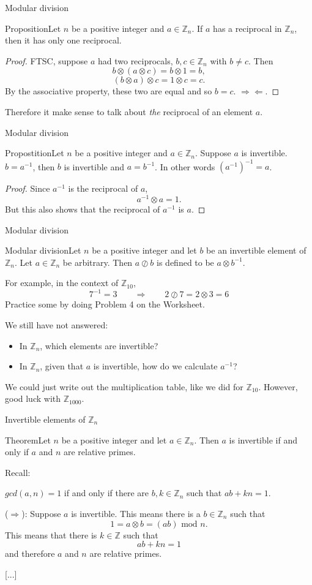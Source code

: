 \documentclass{beamer}
\def\bl[#1]#2{\begin{block}{#1}#2\end{block}}
\def\itemb{\begin{itemize}}
\def\iteme{\end{itemize}}
\begin{document}
\begin{frame}{Modular division}
\bl[Proposition]{Let $n$ be a positive integer and $a\in\mathbb{Z}_n$. If $a$ has a reciprocal in $\mathbb{Z}_n$, then it has only one reciprocal.}

\begin{proof}
FTSC, suppose $a$ had two reciprocals, $b,c\in\mathbb{Z}_n$ with $b\neq c$. Then
\[
b\otimes (a\otimes c)=b\otimes 1=b,
\]
\[
(b\otimes a)\otimes c=1\otimes c=c.
\]
By the associative property, these two are equal and so $b=c$. $\Rightarrow\Leftarrow$.
\end{proof}
Therefore it make sense to talk about \textit{the} reciprocal of an element $a$.
\end{frame}


\begin{frame}{Modular division}
\bl[Propostition]{Let $n$ be a positive integer and $a\in\mathbb{Z}_n$. Suppose $a$ is invertible. $b=a^{-1}$, then $b$ is invertible and $a=b^{-1}$. In other words $(a^{-1})^{-1}=a$.}

\begin{proof}
Since $a^{-1}$ is the reciprocal of $a$,
\[
a^{-1}\otimes a=1.
\]
But this also shows that the reciprocal of $a^{-1}$ is $a$.
\end{proof}
\end{frame}

\begin{frame}{Modular division}
\bl[Modular division]{Let $n$ be a positive integer and let $b$ be an invertible element of $\mathbb{Z}_n$. Let $a\in\mathbb{Z}_n$ be arbitrary. Then $a\oslash b$ is defined to be $a\otimes b^{-1}$.}

For example, in the context of $\mathbb{Z}_{10}$, 
\[
7^{-1}=3\qquad\Rightarrow\qquad 2\oslash 7=2\otimes 3=6
\]
Practice some by doing Problem 4 on the Worksheet.\vspace{0.3cm}

We still have not answered:
\itemb
\item In $\mathbb{Z}_n$, which elements are invertible?
\item In $\mathbb{Z}_n$, given that $a$ is invertible, how do we calculate $a^{-1}$?
\iteme
We could just write out the multiplication table, like we did for $\mathbb{Z}_{10}$. However, good luck with $\mathbb{Z}_{1000}$.
\end{frame}

\begin{frame}{Invertible elements of $\mathbb{Z}_n$}
\bl[Theorem]{Let $n$ be a positive integer and let $a\in\mathbb{Z}_n$. Then $a$ is invertible if and only if $a$ and $n$ are relative primes.}
Recall:
\bl[]{$gcd(a,n)=1$ if and only if there are $b,k\in\mathbb{Z}_n$ such that $ab+kn=1$.}
($\Rightarrow$): Suppose $a$ is invertible. This means there is a $b\in\mathbb{Z}_n$ such that 
\[
1=a\otimes b = (ab)\textrm{ mod } n.
\]
This means that there is $k\in\mathbb{Z}$ such that
\[
ab+kn=1
\]
and therefore $a$ and $n$ are relative primes.

[...]
\end{frame}
\end{document}
